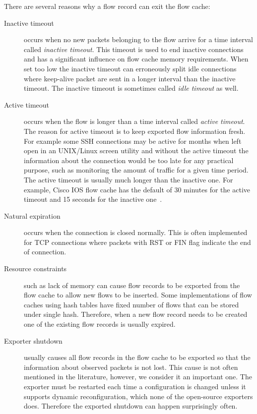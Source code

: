 There are several reasons why a flow record can exit the flow cache:
\begin{description}
    \item[Inactive timeout] occurs when no new packets belonging to the flow arrive for a time interval called \emph{inactive timeout}. This timeout is used to end inactive connections and has a significant influence on flow cache memory requirements. When set too low the inactive timeout can erroneously split idle connections where keep-alive packet are sent in a longer interval than the inactive timeout. The inactive timeout is sometimes called \emph{idle timeout} as well.
    \item[Active timeout] occurs when the flow is longer than a time interval called \emph{active timeout}. The reason for active timeout is to keep exported flow information fresh. For example some SSH connections may be active for months when left open in an UNIX/Linux screen utility and without the active timeout the information about the connection would be too late for any practical purpose, such as monitoring the amount of traffic for a given time period. The active timeout is usually much longer than the inactive one. For example, Cisco IOS flow cache has the default of 30 minutes for the active timeout and 15 seconds for the inactive one~\cite{CiscoSystems-2013-Cisco}.
    \item[Natural expiration] occurs when the connection is closed normally. This is often implemented for TCP connections where packets with RST or FIN flag indicate the end of connection.
    \item[Resource constraints] such as lack of memory can cause flow records to be exported from the flow cache to allow new flows to be inserted. Some implementations of flow caches using hash tables have fixed number of flows that can be stored under single hash. Therefore, when a new flow record needs to be created one of the existing flow records is usually expired.
    \item[Exporter shutdown] usually causes all flow records in the flow cache to be exported so that the information about observed packets is not lost. This cause is not often mentioned in the literature, however, we consider it an important one. The exporter must be restarted each time a configuration is changed unless it supports dynamic reconfiguration, which none of the open-source exporters does. Therefore the exported shutdown can happen surprisingly often.
\end{description}

